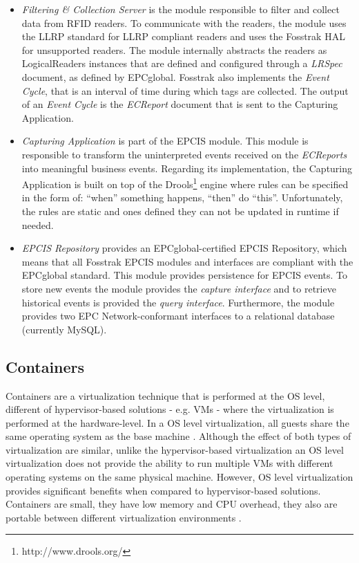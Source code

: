 \begin{itemize}
  \item \textit{Filtering \& Collection Server} is the module responsible to filter and collect data
  from \gls{RFID} readers. To communicate with the readers, the module uses the \gls{LLRP} standard
  for \gls{LLRP} compliant readers and uses the Fosstrak \gls{HAL} for unsupported readers. The
  module internally abstracts the readers as LogicalReaders instances that are defined and configured
  through a \textit{LRSpec} document, as defined by EPCglobal. Fosstrak also implements the
  \textit{Event Cycle}, that is an interval of time during which tags are collected. The output of
  an \textit{Event Cycle} is the \textit{ECReport} document that is sent to the Capturing Application.
  \item \textit{Capturing Application} is part of the EPCIS module. This module is responsible to
  transform the uninterpreted events received on the \textit{ECReports} into meaningful business events.
  Regarding its implementation, the Capturing Application is built on top of the Drools\footnote{http://www.drools.org/}
  engine where rules can be specified in the form of: ``when'' something happens, ``then'' do ``this''.
  Unfortunately, the rules are static and ones defined they can not be updated in runtime if needed.
  \item \textit{EPCIS Repository} provides an EPCglobal-certified EPCIS Repository, which means that
  all Fosstrak EPCIS modules and interfaces are compliant with the EPCglobal standard. This module
  provides persistence for \gls{EPCIS} events. To store new events the module provides the
  \textit{capture interface} and to retrieve historical events is provided the \textit{query interface}.
  Furthermore, the module provides two EPC Network-conformant interfaces to a relational database
  (currently MySQL).
\end{itemize}

\subsection{Containers}
\label{sub:containers}
Containers are a virtualization technique that is performed at the \gls{OS} level, different of
hypervisor-based solutions - e.g. \glspl{VM} - where the virtualization is performed at the hardware-level.
In a \gls{OS} level virtualization, all guests share the same operating system as the base machine \cite{matthews2007quantifying}.
Although the effect of both types of virtualization are similar, unlike the hypervisor-based virtualization
an \gls{OS} level virtualization does not provide the ability to run multiple \glspl{VM} with different
operating systems on the same physical machine. However, \gls{OS} level virtualization provides significant
benefits when compared to hypervisor-based solutions. Containers are small, they have low memory and
\gls{CPU} overhead, they also are portable between different virtualization environments \cite{soltesz2007container}.\\

